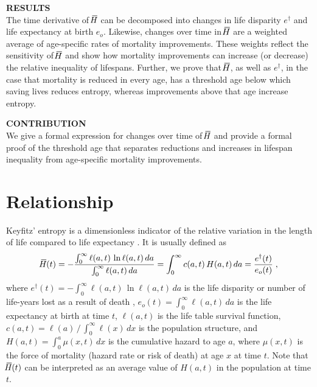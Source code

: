\documentclass[a4paper,twoside, openright, 12pt, leqno]{article}
\newcommand*\xbar[1]{%
   \hbox{%
     \vbox{%
       \hrule height 0.5pt %
       \kern0.3ex%
       \hbox{%
         \kern-0.25em%
         \ensuremath{#1}%
         \kern-0.05em%
       }%
     }%
   }%
}
\begin{document}
\noindent\textbf{RESULTS} \\
The time derivative of $\xbar{H}$ can be decomposed into changes in life disparity $e^\dagger$ and life expectancy at birth $e_o$. Likewise, changes over time in $\xbar{H}$ are a weighted average of age-specific rates of mortality improvements. These weights reflect the sensitivity of $\xbar{H}$ and show how mortality improvements can increase (or decrease) the relative inequality of lifespans. Further, we prove that $\xbar{H}$, as well as $e^\dagger$, in the case that mortality is reduced in every age, has a threshold age below which saving lives reduces entropy, whereas improvements above that age increase entropy.
\bigskip

\noindent\textbf{CONTRIBUTION} \\
We give a formal expression for changes over time of $\xbar{H}$ and provide a formal proof of the threshold age that separates reductions and increases in lifespan inequality from age-specific mortality improvements.

\linespread{1.5}\normalsize
\clearpage



\section{Relationship}
Keyfitz' entropy is a dimensionless indicator of the relative variation in the length of life compared to life expectancy \citep{Keyfitz1977, demetrius1978adaptive}. It is usually defined as
%
\begin{equation*}
\xbar{H}(t)=-\frac{\int_0^\infty\ell(a, t)\,\ln\ell(a, t)\,da}{\int_0^\infty\ell(a, t)\,da}=\int_0^\infty c(a, t)\,H(a,t)\,da=\frac{e^\dagger(t)}{e_o(t)}\;,
\end{equation*}
%
where $e^\dagger(t)=-\int_0^\infty\ell(a,t)\,\ln\ell(a,t)\,da$ is the life disparity or number of life-years lost as a result of death \citep{Vaupel2003}, $e_o(t)=\int_0^\infty\ell(a, t)\,da$ is the life expectancy at birth at time $t$, $\ell(a,t)$ is the life table survival function, $c(a,t)=\ell(a)\,/\,\int_0^\infty\ell(x)\,dx$ is the population structure, and $H(a,t)=\int_0^a\mu(x,t)\,dx$ is the cumulative hazard to age $a$, where $\mu(x,t)$ is the force of mortality (hazard rate or risk of death) at age $x$ at time $t$. Note that $\xbar{H}(t)$ can be interpreted as an average value of $H(a,t)$ in the population at time $t$.
\end{document}
